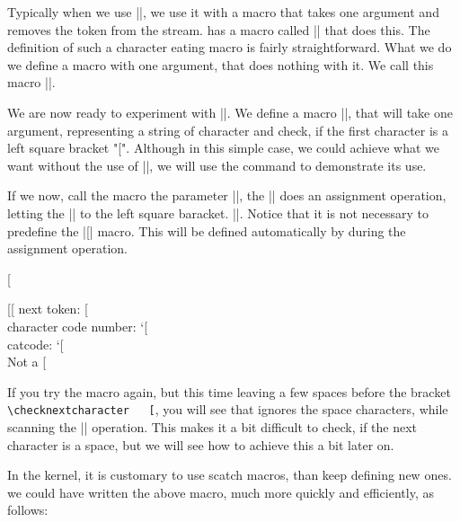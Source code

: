 Typically when we use |\futurelet|, we use it with a macro that takes one argument and removes the token from the stream. \latex has a macro called |\@gobble| that does this. The definition of such a character eating macro is fairly straightforward. What we do we define a macro with one argument, that does nothing with it. We call this macro |\grabacharacter|.
\smallskip
\begin{Code}
\def\grabacharacter#1{}
\end{Code}
\def\grabacharacter#1{}
\smallskip
We are now ready to experiment with |\futurelet|. We define a macro |\checknextcharacter|, that will take one argument, representing a string of character and check, if the first character is a left square bracket "[".
Although in this simple case, we could achieve what we want without the use of |\futurelet|, we will use the command to demonstrate its use.
\medskip
\begin{Code}
\def\checknextcharacter#1{\futurelet\nextchar\grabacharacter#1}
\end{Code}
\def\checknextcharacter#1{\futurelet\nextchar\grabacharacter#1}

\medskip

If we now, call the macro the parameter |\checknextcharacter{[}|, the |\futurelet| does an assignment operation,
letting the |\nextchar| to the left square baracket. |\let\nextchar[|. Notice that it is not necessary to predefine the |\nextchar| macro. This will be defined automatically by \tex during the assignment operation. 

\checknextcharacter[

\if\nextchar[%
     \noindent next token: [\\
     character code number: \number`[\\ 
     catcode: \the\catcode`[ \\
\else Not a [ \\
\fi

If you try the macro again, but this time leaving a few spaces before the bracket \verb*+\checknextcharacter   [+, you will see that \tex ignores the space characters, while scanning the |\futurelet| operation. This makes it a bit difficult to check, if the next character is a space, but we will see how to achieve this a bit later on.

In the \latex kernel, it is customary to use scatch macros, than keep defining new ones. we could have written the above macro, much more quickly and efficiently, as follows:
\medskip

